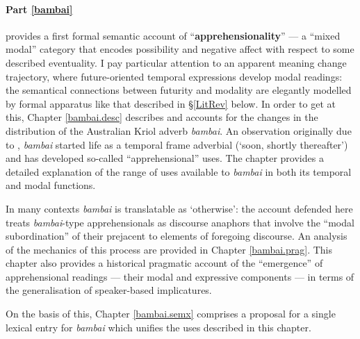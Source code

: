 \documentclass[11pt,dvipsnames]{report}
\begin{document}
\paragraph{Part \ref{bambai}} provides a first formal semantic account of ``\textbf{apprehensionality}'' --- a ``mixed modal'' category that encodes possibility and negative affect with respect to some described eventuality. I pay particular attention to an apparent meaning change trajectory, where future-oriented temporal expressions develop modal readings: the semantical connections between futurity and modality are elegantly modelled by formal apparatus like that described in \S \ref{LitRev} below. In order to get at this, Chapter \ref{bambai.desc} describes and accounts for the changes in the distribution of the Australian Kriol adverb \textit{bambai}. An observation originally due to \citet{Angelo2016,Angelo2018}, \textit{bambai} started life as a temporal frame adverbial (`soon, shortly thereafter') and has developed so-called ``apprehensional'' uses. The chapter provides a detailed explanation of the range of uses available to \textit{bambai} in both its temporal and modal functions. 

In many contexts \textit{bambai} is translatable as `otherwise': the account defended here treats \textit{bambai}-type apprehensionals as discourse anaphors that involve the ``modal subordination'' of their prejacent to elements of foregoing discourse. An analysis of the mechanics of this process are provided in Chapter \ref{bambai.prag}. This chapter also provides a historical pragmatic account of the ``emergence'' of apprehensional readings --- their modal and expressive components --- in terms of the generalisation of speaker-based implicatures.

On the basis of this, Chapter \ref{bambai.semx} comprises a proposal for a single lexical entry for \textit{bambai} which unifies the uses described in this chapter. 
\end{document}
